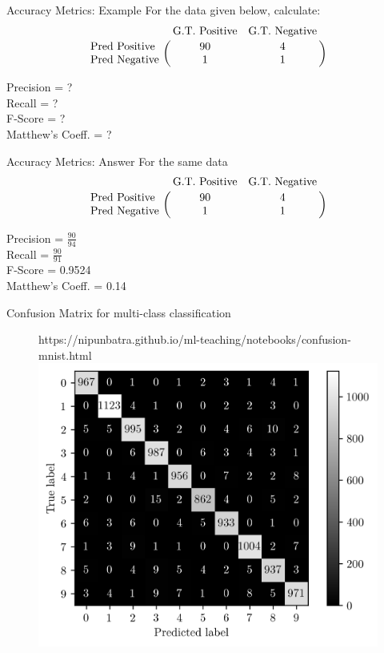 \documentclass[usenames,dvipsnames]{beamer}
\begin{document}
\begin{frame}{Accuracy Metrics: Example}
For the data given below, calculate: 
$$
\bordermatrix{&\text{G.T. Positive}&\text{G.T. Negative}\cr
               \text{Pred Positive}&90&4\cr
               \text{Pred Negative}&1&1}
$$

Precision = ?  \\
Recall = ?\\
F-Score = ?\\
Matthew's Coeff. = ?\\
\end{frame}

\begin{frame}{Accuracy Metrics: Answer}
For the same data
$$
\bordermatrix{&\text{G.T. Positive}&\text{G.T. Negative}\cr
               \text{Pred Positive}&90&4\cr
               \text{Pred Negative}&1&1}
$$

Precision = $\frac{90}{94}$ \\
Recall = $\frac{90}{91}$ \\
F-Score = 0.9524 \\
Matthew's Coeff. = 0.14
\end{frame}


\begin{frame}{Confusion Matrix for multi-class classification}
	\begin{figure}[htp]
		\centering
		\begin{notebookbox}{https://nipunbatra.github.io/ml-teaching/notebooks/confusion-mnist.html}
		  \includegraphics[scale=0.5]{../assets/accuracy-convention/figures/mnist-cm.png}
		\end{notebookbox}
	  \end{figure}
	
\end{frame}
\end{document}
